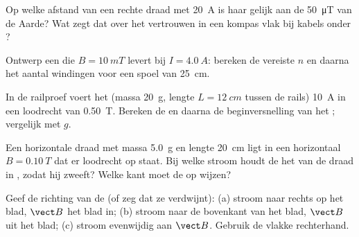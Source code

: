 \begin{exercise}[$\star\star$]\label{exo:g11:magnetic-fields:7}
Op welke afstand van een rechte draad met \qty{20}{A} is haar  gelijk
aan de \qty{50}{\micro T} van de Aarde? Wat zegt dat over het vertrouwen
in een kompas vlak bij kabels onder ?
\end{exercise}

\begin{exercise}[$\star\star$]\label{exo:g11:magnetic-fields:8}
Ontwerp een  die $B = \qty{10}{mT}$ levert bij
$I = \qty{4.0}{A}$: bereken de vereiste $n$ en daarna het aantal
windingen voor een spoel van \qty{25}{cm}.
\end{exercise}

\begin{exercise}[$\star\star$]\label{exo:g11:magnetic-fields:9}
In de railproef voert het  (massa \qty{20}{g}, lengte
$L = \qty{12}{cm}$ tussen de rails) \qty{10}{A} in een loodrecht  van
\qty{0.50}{T}. Bereken de  en daarna de beginversnelling van
het ; vergelijk met $g$.
\end{exercise}

\begin{exercise}[$\star\star$]\label{exo:g11:magnetic-fields:10}
Een horizontale draad met massa \qty{5.0}{g} en lengte \qty{20}{cm} ligt
in een horizontaal  $B = \qty{0.10}{T}$ dat er loodrecht op staat.
Bij welke stroom houdt de  het  van de draad in
, zodat hij zweeft? Welke kant moet de  op wijzen?
\end{exercise}

\begin{exercise}[$\star\star$]\label{exo:g11:magnetic-fields:11}
Geef de richting van de  (of zeg dat ze verdwijnt):
(a) stroom naar rechts op het blad, $\vect B$ het blad in; (b) stroom
naar de bovenkant van het blad, $\vect B$ uit het blad; (c) stroom
evenwijdig aan $\vect B$. Gebruik de vlakke rechterhand.
\end{exercise}

